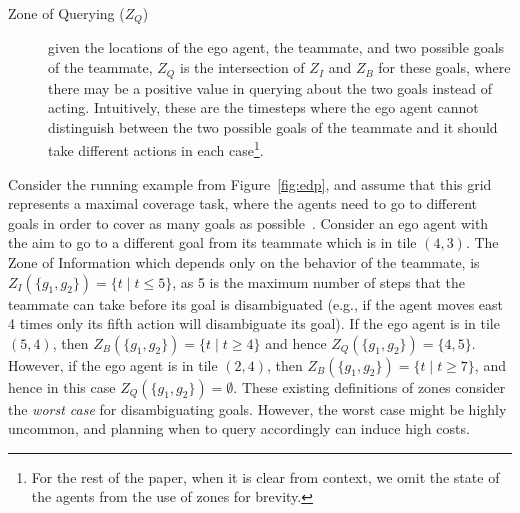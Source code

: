 \documentclass[letterpaper]{article}
\begin{document}
\begin{description}
\item [Zone of Querying ($Z_Q$)] given the locations of the ego agent, the teammate, and two possible goals of the teammate, $Z_Q$ is the intersection of $Z_I$ and $Z_B$ for these goals, where there may be a positive value in querying about the two goals instead of acting. Intuitively, these are the timesteps where the ego agent cannot distinguish between the two possible goals of the teammate and it should take different actions in each case\footnote{For the rest of the paper, when it is clear from context, we omit the state of the agents from the use of zones for brevity.}.
\end{description}

\noindent  Consider the running example from Figure~\ref{fig:edp}, and assume that this grid represents a maximal coverage task, where the agents need to go to different goals in order to cover as many goals as possible~\cite{pita2008deployed}. Consider an ego agent with the aim to go to a different goal from its teammate which is in tile $(4,3)$. The Zone of Information which depends only on the behavior of the teammate, is $Z_I(\{g_1,g_2\})=\{t \mid t \leq 5\}$, as 5 is the maximum number of steps that the teammate can take before its goal is disambiguated (e.g., if the agent moves east 4 times only its fifth action will disambiguate its goal). If the ego agent is in tile $(5,4)$, then $Z_B(\{g_1,g_2\})=\{t \mid t \geq 4\}$ and hence $Z_Q(\{g_1,g_2\})=\{4,5\}$. However, if the ego agent is in tile $(2,4)$, then $Z_B(\{g_1,g_2\})=\{t \mid t \geq 7\}$, and hence in this case $Z_Q(\{g_1,g_2\})=\emptyset$.
These existing definitions of zones consider the \emph{worst case} for disambiguating goals. However, the worst case might be highly uncommon, and planning when to query accordingly can induce high costs.
\end{document}
